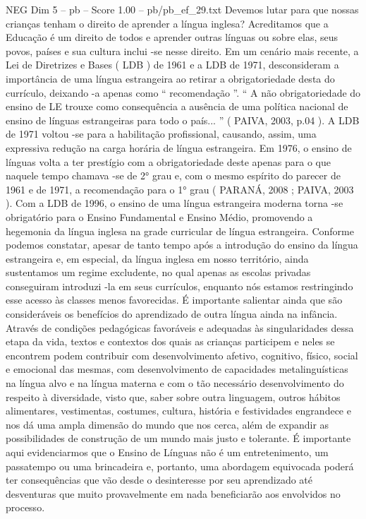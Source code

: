 \begin{textsample}{NEG Dim 5 – pb – Score 1.00 – pb/pb\_ef\_29.txt}
Devemos lutar para que nossas crianças tenham o direito de aprender a língua inglesa?
Acreditamos que a Educação é um direito de todos e aprender outras línguas ou sobre elas, seus povos, países e sua cultura inclui -se nesse direito.
Em um cenário mais recente, a Lei de Diretrizes e Bases ( LDB ) de 1961 e a LDB de 1971, desconsideram a importância de uma língua estrangeira ao retirar a obrigatoriedade desta do currículo, deixando -a apenas como “ recomendação ”. “ A não obrigatoriedade do ensino de LE trouxe como consequência a ausência de uma política nacional de ensino de línguas estrangeiras para todo o país... ” ( PAIVA, 2003, p.04 ).
A LDB de 1971 voltou -se para a habilitação profissional, causando, assim, uma expressiva redução na carga horária de língua estrangeira.
Em 1976, o ensino de línguas volta a ter prestígio com a obrigatoriedade deste apenas para o que naquele tempo chamava -se de 2{\EmojiFont °} grau e, com o mesmo espírito do parecer de 1961 e de 1971, a recomendação para o 1{\EmojiFont °} grau ( PARANÁ, 2008 ; PAIVA, 2003 ).
Com a LDB de 1996, o ensino de uma língua estrangeira moderna torna -se obrigatório para o Ensino Fundamental e Ensino Médio, promovendo a hegemonia da língua inglesa na grade curricular de língua estrangeira.
Conforme podemos constatar, apesar de tanto tempo após a introdução do ensino da língua estrangeira e, em especial, da língua inglesa em nosso território, ainda sustentamos um regime excludente, no qual apenas as escolas privadas conseguiram introduzi -la em seus currículos, enquanto nós estamos restringindo esse acesso às classes menos favorecidas.
É importante salientar ainda que são consideráveis os benefícios do aprendizado de outra língua ainda na infância.
Através de condições pedagógicas favoráveis e adequadas às singularidades dessa etapa da vida, textos e contextos dos quais as crianças participem e neles se encontrem podem contribuir com desenvolvimento afetivo, cognitivo, físico, social e emocional das mesmas, com desenvolvimento de capacidades metalinguísticas na língua alvo e na língua materna e com o tão necessário desenvolvimento do respeito à diversidade, visto que, saber sobre outra linguagem, outros hábitos alimentares, vestimentas, costumes, cultura, história e festividades engrandece e nos dá uma ampla dimensão do mundo que nos cerca, além de expandir as possibilidades de construção de um mundo mais justo e tolerante.
É importante aqui evidenciarmos que o Ensino de Línguas não é um entretenimento, um passatempo ou uma brincadeira e, portanto, uma abordagem equivocada poderá ter consequências que vão desde o desinteresse por seu aprendizado até desventuras que muito provavelmente em nada beneficiarão aos envolvidos no processo.

\end{textsample}
